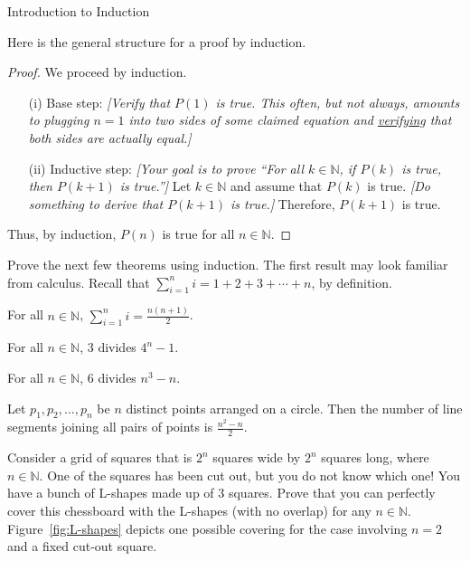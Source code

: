 \begin{section}{Introduction to Induction}
\begin{skeleton}
Here is the general structure for a proof by induction.

\begin{mdframed}[style=skeleton]
\begin{proof}
We proceed by induction.
\begin{enumerate}\setlength{\itemsep}{0in}
\item[(i)] Base step: \emph{[Verify that $P(1)$ is true. This often, but not always, amounts to plugging $n=1$ into two sides of some claimed equation and \underline{verifying} that both sides are actually equal.]}

\item[(ii)] Inductive step:  \emph{[Your goal is to prove ``For all $k\in\mathbb{N}$, if $P(k)$ is true, then $P(k+1)$ is true.'']} Let $k\in\mathbb{N}$ and assume that $P(k)$ is true. \emph{[Do something to derive that $P(k+1)$ is true.]} Therefore, $P(k+1)$ is true.
\end{enumerate}
Thus, by induction, $P(n)$ is true for all $n\in\mathbb{N}$.
\end{proof}
\end{mdframed}
\end{skeleton}

Prove the next few theorems using induction.  The first result may look familiar from calculus. Recall that $\displaystyle \sum_{i=1}^{n}i=1+2+3+\cdots +n$, by definition.

\begin{theorem}
For all $n\in\mathbb{N}$, $\displaystyle \sum_{i=1}^{n}i=\frac{n(n+1)}{2}$.
\end{theorem}

\begin{theorem}
For all $n\in\mathbb{N}$, 3 divides $4^{n}-1$.
\end{theorem}

\begin{theorem}
For all $n\in\mathbb{N}$, 6 divides $n^{3}-n$.
\end{theorem}

\begin{theorem}
Let $p_{1}, p_{2}, \ldots, p_{n}$ be $n$ distinct points arranged on a circle.  Then the number of line segments joining all pairs of points is $\frac{n^{2}-n}{2}$.
\end{theorem}

\begin{problem}\label{prob:L-shapes}
Consider a grid of squares that is $2^n$ squares wide by $2^n$ squares long, where $n\in\mathbb{N}$. One of the squares has been cut out, but you do not know which one!  You have a bunch of L-shapes made up of $3$ squares.  Prove that you can perfectly cover this chessboard with the L-shapes (with no overlap) for any $n\in\mathbb{N}$. Figure~\ref{fig:L-shapes} depicts one possible covering for the case involving $n=2$ and a fixed cut-out square.
\end{problem}


\end{section}
